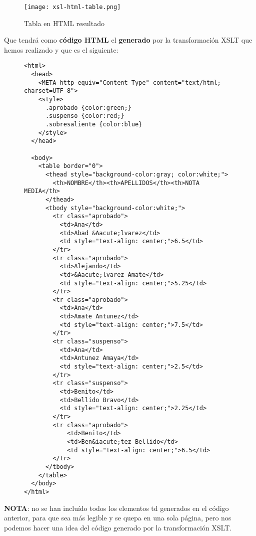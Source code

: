 \begin{itemize}
    \begin{figure}[H]
        \centering
        \texttt{[image: xsl-html-table.png]}
        \caption{Tabla en HTML resultado}
    \end{figure}

    Que tendrá como \textbf{código HTML} el \textbf{generado} por la transformación XSLT que hemos realizado y que es el siguiente:

    \begin{figure}[H]
        \begin{tcolorbox}[sharp corners, colback=yellow!30, colframe=white!20]
            \scriptsize
\begin{verbatim}
<html>
  <head>
    <META http-equiv="Content-Type" content="text/html; charset=UTF-8">
    <style>
      .aprobado {color:green;}
      .suspenso {color:red;}
      .sobresaliente {color:blue}
    </style>
  </head>

  <body>
    <table border="0">
      <thead style="background-color:gray; color:white;">
        <th>NOMBRE</th><th>APELLIDOS</th><th>NOTA MEDIA</th>
      </thead>
      <tbody style="background-color:white;">
        <tr class="aprobado">
          <td>Ana</td>
          <td>Abad &Aacute;lvarez</td>
          <td style="text-align: center;">6.5</td>
        </tr>
        <tr class="aprobado">
          <td>Alejando</td>
          <td>&Aacute;lvarez Amate</td>
          <td style="text-align: center;">5.25</td>
        </tr>
        <tr class="aprobado">
          <td>Ana</td>
          <td>Amate Antunez</td>
          <td style="text-align: center;">7.5</td>
        </tr>
        <tr class="suspenso">
          <td>Ana</td>
          <td>Antunez Amaya</td>
          <td style="text-align: center;">2.5</td>
        </tr>
        <tr class="suspenso">
          <td>Benito</td>
          <td>Bellido Bravo</td>
          <td style="text-align: center;">2.25</td>
        </tr>
        <tr class="aprobado">
            <td>Benito</td>
            <td>Ben&iacute;tez Bellido</td>
            <td style="text-align: center;">6.5</td>
        </tr>
      </tbody>
    </table>
  </body>
</html>
\end{verbatim}
        \end{tcolorbox}
    \end{figure}

    \textbf{NOTA}: no se han incluído todos los elementos td generados en el código anterior, para que sea más legible y se quepa en una sola página, pero nos podemos hacer una idea del código generado por la transformación XSLT.
\end{itemize}

